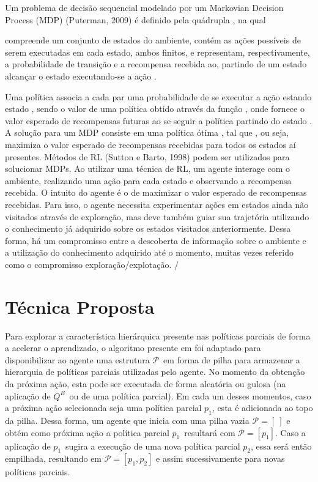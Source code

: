\documentclass[kdmile,a4paper]{kdmile} %
\newcommand{\pilhaS}{\mathcal{P}}
\newcommand{\pilha}{$\pilhaS$}
\newcommand{\qbS}{Q^B}
\newcommand{\qb}{$\qbS$}
\newcommand{\peumS}{p_1}
\newcommand{\peum}{$\peumS$}
\begin{document}
Um problema de decisão sequencial modelado por um Markovian Decision
Process (MDP) (Puterman, 2009) é definido pela quádrupla , na qual


compreende um conjunto de estados do ambiente, contém as ações
possíveis de serem executadas em cada estado, ambos finitos, e
representam, respectivamente, a probabilidade de transição e a
recompensa recebida ao, partindo de um estado alcançar o estado
executando-se a ação .

Uma política  associa a cada par  uma probabilidade de se executar a
ação  estando estado , sendo o valor de uma política  obtido através
da função , onde  fornece o valor esperado de recompensas futuras ao
se seguir a política  partindo do estado .
A solução para um MDP consiste em uma política ótima , tal que , ou
seja,  maximiza o valor esperado de recompensas recebidas para todos
os estados aí presentes.
Métodos de RL (Sutton e Barto, 1998) podem ser utilizados para
solucionar MDPs. Ao utilizar uma técnica de RL, um agente interage com
o ambiente, realizando uma ação para cada estado e observando a
recompensa recebida. O intuito do agente é o de maximizar o valor
esperado de recompensas recebidas.
Para isso, o agente necessita experimentar ações em estados ainda não
visitados através de exploração, mas deve também guiar sua trajetória
utilizando o conhecimento já adquirido sobre os estados visitados
anteriormente.
Dessa forma, há um compromisso entre a descoberta de informação sobre
o ambiente e a utilização do conhecimento adquirido até o momento,
muitas vezes referido como o compromisso exploração/explotação.
/
\section{Técnica Proposta}\label{sec:algoritmo}
Para explorar a característica hierárquica presente nas políticas
parciais de forma a acelerar o aprendizado, o algoritmo presente em
\cite{imrl2004} foi adaptado para disponibilizar ao agente uma
estrutura \pilha\ em forma de pilha para armazenar a hierarquia de
políticas parciais utilizadas pelo agente.  No momento da obtenção da
próxima ação, esta pode ser executada de forma aleatória ou gulosa (na
aplicação de \qb\ ou de uma política parcial).  Em cada um desses
momentos, caso a próxima ação selecionada seja uma política parcial
$p_1$, esta é adicionada ao topo da pilha.  Dessa forma, um agente que
inicia com uma pilha vazia $\pilhaS=[\ ]$ e obtém como próxima ação a
política parcial \peum\ resultará com $\pilhaS=[\peumS]$. Caso a
aplicação de \peum\ sugira a execução de uma nova política parcial
$p_2$, essa será então empilhada, resultando em $\pilhaS=[\peumS,
p_2]$ e assim sucessivamente para novas políticas parciais.
\end{document}
